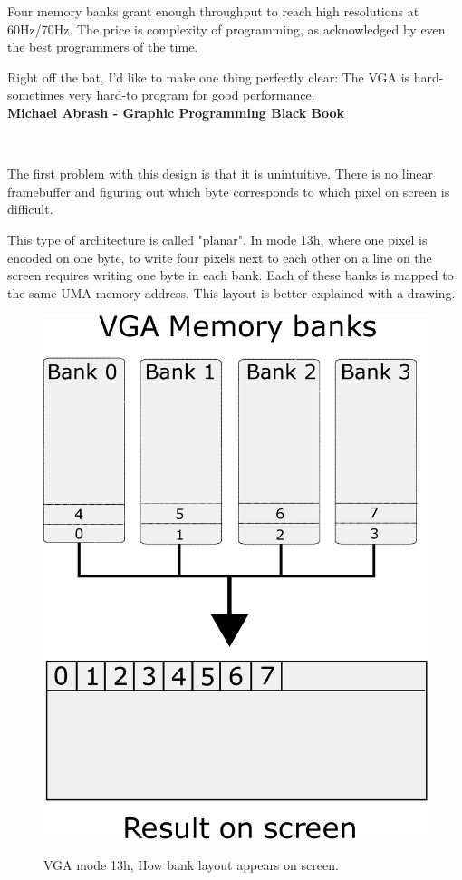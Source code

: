 \documentclass[book.tex]{subfiles}
\begin{document}
Four memory banks grant enough throughput to reach high resolutions at 60Hz/70Hz. The price is complexity of programming, as acknowledged by even the best programmers of the time.\\
 \begin{fancyquotes}
   Right off the bat, I'd like to make one thing perfectly clear: The VGA is hard-sometimes very hard-to program for good performance.
 \bigskip \\
\textbf{Michael Abrash - Graphic Programming Black Book}
 \end{fancyquotes}
 \\
\par
The first problem with this design is that it is unintuitive. There is no linear framebuffer and figuring out which byte corresponds to which pixel on screen is difficult.\\
\par
 This type of architecture is called "planar". In mode 13h, where one pixel is encoded on one byte, to write four pixels next to each other on a line on the screen requires writing one byte in each bank. Each of these banks is mapped to the same UMA memory address. This layout is better explained with a drawing.\\
\par
\begin{figure}[H]
\centering
\includegraphics[width=.57\textwidth]{imgs/drawings/vga_ram_screen_layout.eps}
\label{fig:vga_layout_banks}
\caption{VGA mode 13h, How bank layout appears on screen.}
\end{figure}
\end{document}
